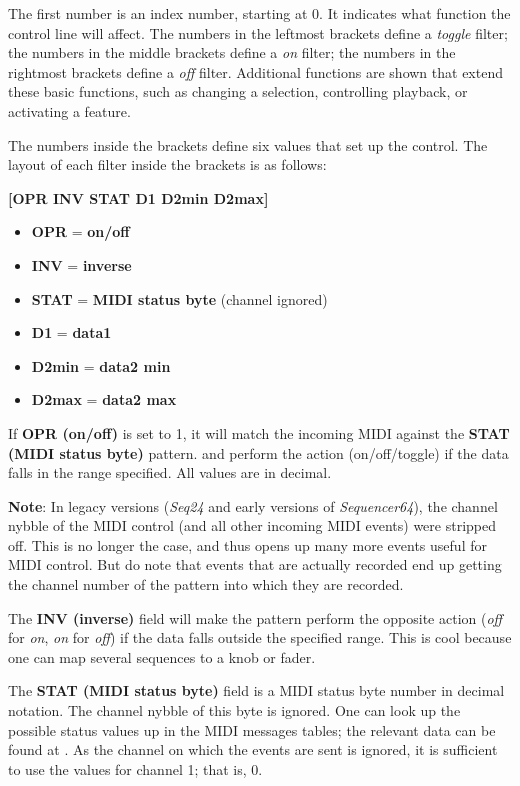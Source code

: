    The first number is an index number, starting at 0.  It indicates what
   function the control line will affect.
   The numbers in the leftmost brackets define a \textsl{toggle} filter;
   the numbers in the middle brackets define a \textsl{on} filter;
   the numbers in the rightmost brackets define a \textsl{off} filter.
   Additional functions are shown that extend these basic functions,
   such as changing a selection, controlling playback, or activating a feature.

   The numbers inside the brackets define six values that set up the control.
   The layout of each filter inside the brackets is as follows:

      \textbf{[OPR INV STAT D1 D2min D2max]}

   \begin{itemize}
      \item \textbf{OPR} = \textbf{on/off}
      \item \textbf{INV} = \textbf{inverse}
      \item \textbf{STAT} = \textbf{MIDI status byte} (channel ignored) 
      \item \textbf{D1} = \textbf{data1}
      \item \textbf{D2min} = \textbf{data2 min}
      \item \textbf{D2max} = \textbf{data2 max}
   \end{itemize}

   If \textbf{OPR (on/off)} is set to 1, it will match the incoming MIDI
   against the \textbf{STAT (MIDI status byte)} pattern.
   and perform the action (on/off/toggle) if the data
   falls in the range specified.  All values are in decimal.

   \textbf{Note}: In legacy versions (\textsl{Seq24} and early versions
   of \textsl{Sequencer64}), the channel nybble of the MIDI control (and all
   other incoming MIDI events) were stripped off.
   This is no longer the case, and thus opens up many more events useful for
   MIDI control.   But do note that events that are actually recorded end up
   getting the channel number of the pattern into which they are recorded.

   The \textbf{INV (inverse)} field will make the pattern perform the opposite
   action (\textsl{off} for \textsl{on}, \textsl{on} for \textsl{off}) if the
   data falls outside the specified range.  This is cool because one can map
   several sequences to a knob or fader.

   The \textbf{STAT (MIDI status byte)} field is a MIDI status byte number in
   decimal notation.  The channel nybble of this byte is ignored.  One can look
   up the possible status values up in the MIDI messages tables; the relevant
   data can be found at \cite{midicontroltable}.  As the channel on which the
   events are sent is ignored, it is sufficient to use the values for channel
   1; that is, 0.

